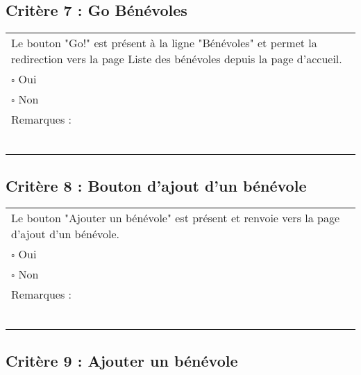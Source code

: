   		
  	\subsection*{Critère 7 : Go Bénévoles}
	
	\begin{center}
    	 		\begin{tabular}[h]{|p{}|}
			\hline
				Le bouton "Go!" est présent à la ligne "Bénévoles" et permet la redirection vers la page Liste des bénévoles depuis la page d'accueil. \\
				$\square$ Oui  \\ $\square$ Non \\\hline Remarques : \\ ~\\
			 \\\hline
     		\end{tabular}
  		\end{center}	
  		
  		
  	\subsection*{Critère 8 : Bouton d'ajout d'un bénévole}
	
	\begin{center}
    	 		\begin{tabular}[h]{|p{}|}
			\hline
				Le bouton "Ajouter un bénévole" est présent et renvoie vers la page d'ajout d'un bénévole. \\
				$\square$ Oui  \\ $\square$ Non \\\hline Remarques : \\ ~\\
			 \\\hline
     		\end{tabular}
  		\end{center}	
  		
  		
  	\subsection*{Critère 9 : Ajouter un bénévole}
	
